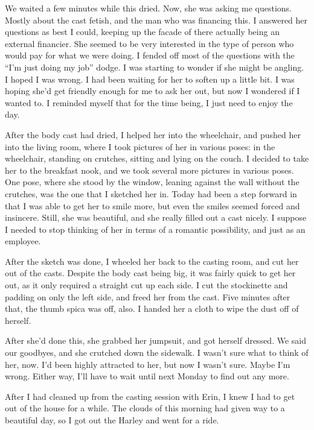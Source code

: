 We waited a few minutes while this dried. Now, she was asking me questions. Mostly about
the cast fetish, and the man who was financing this. I answered her questions as best I could,
keeping up the facade of there actually being an external financier. She seemed to be very
interested in the type of person who would pay for what we were doing. I fended off most of the
questions with the ``I'm just doing my job'' dodge. I was starting to wonder if she might be
angling. I hoped I was wrong. I had been waiting for her to soften up a little bit. I was hoping
she'd get friendly enough for me to ask her out, but now I wondered if I wanted to. I reminded
myself that for the time being, I just need to enjoy the day.

After the body cast had dried, I helped her into the wheelchair, and pushed her into the
living room, where I took pictures of her in various poses: in the wheelchair, standing on
crutches, sitting and lying on the couch. I decided to take her to the breakfast nook, and we
took several more pictures in various poses. One pose, where she stood by the window, leaning
against the wall without the crutches, was the one that I sketched her in. Today had been a step
forward in that I was able to get her to smile more, but even the smiles seemed forced and
insincere. Still, she was beautiful, and she really filled out a cast nicely. I suppose I needed
to stop thinking of her in terms of a romantic possibility, and just as an employee.

After the sketch was done, I wheeled her back to the casting room, and cut her out of the
casts. Despite the body cast being big, it was fairly quick to get her out, as it only required
a straight cut up each side. I cut the stockinette and padding on only the left side, and freed
her from the cast. Five minutes after that, the thumb spica was off, also. I handed her a cloth
to wipe the dust off of herself.

After she'd done this, she grabbed her jumpsuit, and got herself dressed. We said our
goodbyes, and she crutched down the sidewalk. I wasn't sure what to think of her, now. I'd been
highly attracted to her, but now I wasn't sure. Maybe I'm wrong. Either way, I'll have to wait
until next Monday to find out any more.

After I had cleaned up from the casting session with Erin, I knew I had to get out of the
house for a while. The clouds of this morning had given way to a beautiful day, so I got out the
Harley and went for a ride.

